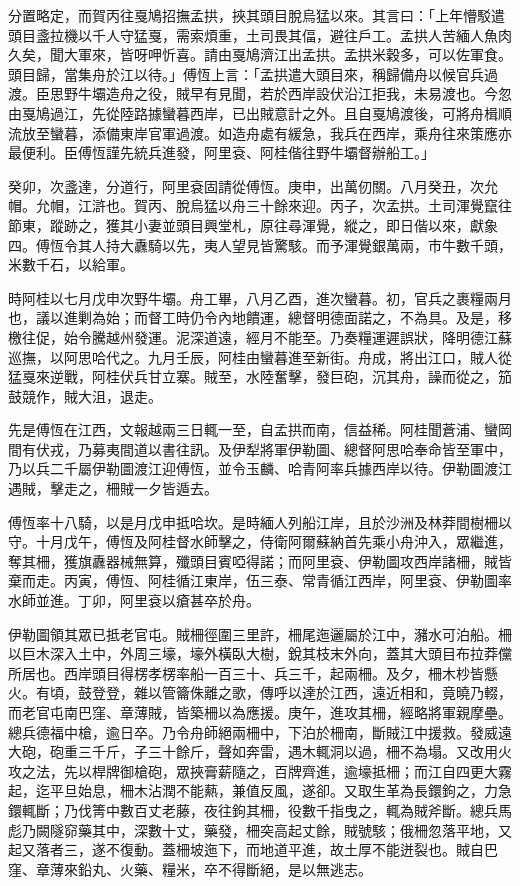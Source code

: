 \begin{pinyinscope}
分置略定，而賀丙往戛鳩招撫孟拱，挾其頭目脫烏猛以來。其言曰：「上年懵駁遣頭目盞拉機以千人守猛戛，需索煩重，土司畏其偪，避往戶工。孟拱人苦緬人魚肉久矣，聞大軍來，皆呀呷忻喜。請由戛鳩濟江出孟拱。孟拱米穀多，可以佐軍食。頭目歸，當集舟於江以待。」傅恆上言：「孟拱遣大頭目來，稱歸備舟以候官兵過渡。臣思野牛壩造舟之役，賊早有見聞，若於西岸設伏沿江拒我，未易渡也。今忽由戛鳩過江，先從陸路據蠻暮西岸，已出賊意計之外。且自戛鳩渡後，可將舟楫順流放至蠻暮，添備東岸官軍過渡。如造舟處有緩急，我兵在西岸，乘舟往來策應亦最便利。臣傅恆謹先統兵進發，阿里袞、阿桂偕往野牛壩督辦船工。」

癸卯，次盞達，分道行，阿里袞固請從傅恆。庚申，出萬仞關。八月癸丑，次允帽。允帽，江滸也。賀丙、脫烏猛以舟三十餘來迎。丙子，次孟拱。土司渾覺竄往節東，蹤跡之，獲其小妻並頭目興堂札，原往尋渾覺，縱之，即日偕以來，獻象四。傅恆令其人持大纛騎以先，夷人望見皆驚駭。而予渾覺銀萬兩，市牛數千頭，米數千石，以給軍。

時阿桂以七月戊申次野牛壩。舟工畢，八月乙酉，進次蠻暮。初，官兵之裹糧兩月也，議以進剿為始；而督工時仍令內地饋運，總督明德面諾之，不為具。及是，移檄往促，始令騰越州發運。泥深道遠，經月不能至。乃奏糧運遲誤狀，降明德江蘇巡撫，以阿思哈代之。九月壬辰，阿桂由蠻暮進至新街。舟成，將出江口，賊人從猛戛來逆戰，阿桂伏兵甘立寨。賊至，水陸奮擊，發巨砲，沉其舟，譟而從之，笳鼓競作，賊大沮，退走。

先是傅恆在江西，文報越兩三日輒一至，自孟拱而南，信益稀。阿桂聞蒼浦、蠻岡間有伏戎，乃募夷間道以書往訊。及伊犁將軍伊勒圖、總督阿思哈奉命皆至軍中，乃以兵二千屬伊勒圖渡江迎傅恆，並令玉麟、哈青阿率兵據西岸以待。伊勒圖渡江遇賊，擊走之，柵賊一夕皆遁去。

傅恆率十八騎，以是月戊申抵哈坎。是時緬人列船江岸，且於沙洲及林莽間樹柵以守。十月戊午，傅恆及阿桂督水師擊之，侍衛阿爾蘇納首先乘小舟沖入，眾繼進，奪其柵，獲旗纛器械無算，殲頭目賓啞得諾；而阿里袞、伊勒圖攻西岸諸柵，賊皆棄而走。丙寅，傅恆、阿桂循江東岸，伍三泰、常青循江西岸，阿里袞、伊勒圖率水師並進。丁卯，阿里袞以瘡甚卒於舟。

伊勒圖領其眾已抵老官屯。賊柵徑圍三里許，柵尾迤邐屬於江中，瀦水可泊船。柵以巨木深入土中，外周三壕，壕外橫臥大樹，銳其枝末外向，蓋其大頭目布拉莽儻所居也。西岸頭目得楞孝楞率船一百三十、兵三千，起兩柵。及夕，柵木杪皆懸火。有頃，鼓登登，雜以管籥侏離之歌，傳呼以達於江西，遠近相和，竟曉乃輟，而老官屯南巴窪、章薄賊，皆築柵以為應援。庚午，進攻其柵，經略將軍親摩壘。總兵德福中槍，逾日卒。乃令舟師絕兩柵中，下泊於柵南，斷賊江中援救。發威遠大砲，砲重三千斤，子三十餘斤，聲如奔雷，遇木輒洞以過，柵不為塌。又改用火攻之法，先以桿牌御槍砲，眾挾膏薪隨之，百牌齊進，逾壕抵柵；而江自四更大霧起，迄平旦始息，柵木沾潤不能爇，兼值反風，遂卻。又取生革為長鐶鉤之，力急鐶輒斷；乃伐箐中數百丈老藤，夜往鉤其柵，役數千指曳之，輒為賊斧斷。總兵馬彪乃闕隧窌藥其中，深數十丈，藥發，柵突高起丈餘，賊號駭；俄柵忽落平地，又起又落者三，遂不復動。蓋柵坡迤下，而地道平進，故土厚不能迸裂也。賊自巴窪、章薄來鉛丸、火藥、糧米，卒不得斷絕，是以無逃志。


\end{pinyinscope}
